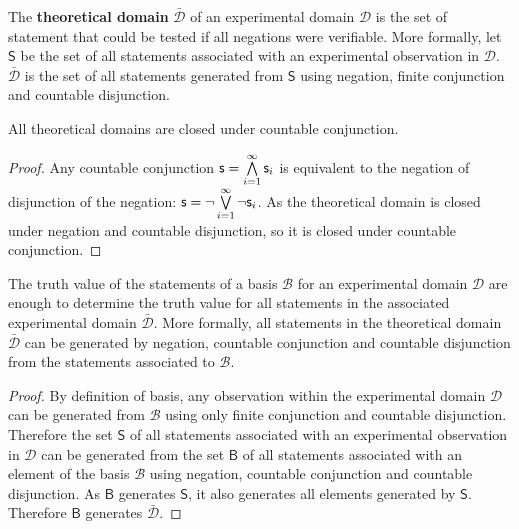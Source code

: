 \documentclass[11pt,letterpaper,fleqn]{memoir} %
\begin{document}
\begin{mathSection}

\begin{defn}
	The \textbf{theoretical domain} $\bar{\mathcal{D}}$ of an experimental domain $\mathcal{D}$ is the set of statement that could be tested if all negations were verifiable. More formally, let $\mathsf{S}$ be the set of all statements associated with an experimental observation in $\mathcal{D}$. $\bar{\mathcal{D}}$ is the set of all statements generated from $\mathsf{S}$ using negation, finite conjunction and countable disjunction.
\end{defn}

\begin{prop}
	All theoretical domains are closed under countable conjunction.
\end{prop}

\begin{proof}
	Any countable conjunction $\mathsf{s} = \bigwedge\limits_{i=1}^{\infty} \mathsf{s}_i$ is equivalent to the negation of disjunction of the negation: $\mathsf{s} = \neg\bigvee\limits_{i=1}^{\infty} \neg\mathsf{s}_i$. As the theoretical domain is closed under negation and countable disjunction, so it is closed under countable conjunction.  
\end{proof}

\begin{prop}
	The truth value of the statements of a basis $\mathcal{B}$ for an experimental domain $\mathcal{D}$ are enough to determine the truth value for all statements in the associated experimental domain $\bar{\mathcal{D}}$. More formally, all statements in the theoretical domain $\bar{\mathcal{D}}$ can be generated by negation, countable conjunction and countable disjunction from the statements associated to $\mathcal{B}$.
\end{prop}

\begin{proof}
	By definition of basis, any observation within the experimental domain $\mathcal{D}$ can be generated from $\mathcal{B}$ using only finite conjunction and countable disjunction. Therefore the set $\mathsf{S}$ of all statements associated with an experimental observation in $\mathcal{D}$ can be generated from the set $\mathsf{B}$ of all statements associated with an element of the basis $\mathcal{B}$ using negation, countable conjunction and countable disjunction. As $\mathsf{B}$ generates $\mathsf{S}$, it also generates all elements generated by $\mathsf{S}$. Therefore $\mathsf{B}$ generates $\bar{\mathcal{D}}$.
\end{proof}


\end{mathSection}
\end{document}
